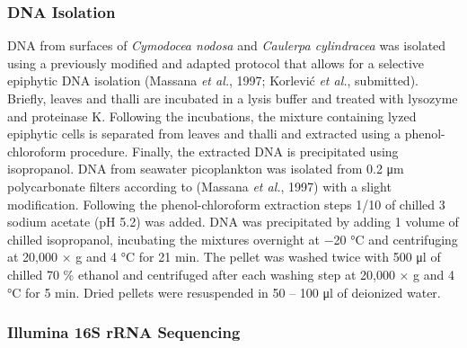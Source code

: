 \documentclass[12pt,]{article}
\begin{document}
\hypertarget{dna-isolation}{%
\subsubsection{DNA Isolation}\label{dna-isolation}}

DNA from surfaces of \emph{Cymodocea nodosa} and \emph{Caulerpa
cylindracea} was isolated using a previously modified and adapted
protocol that allows for a selective epiphytic DNA isolation (Massana
\emph{et al.}, 1997; Korlević \emph{et al.}, submitted). Briefly, leaves
and thalli are incubated in a lysis buffer and treated with lysozyme and
proteinase K. Following the incubations, the mixture containing lyzed
epiphytic cells is separated from leaves and thalli and extracted using
a phenol-chloroform procedure. Finally, the extracted DNA is
precipitated using isopropanol. DNA from seawater picoplankton was
isolated from 0.2 \si{\um} polycarbonate filters according to (Massana
\emph{et al.}, 1997) with a slight modification. Following the
phenol-chloroform extraction steps 1/10 of chilled 3 \si{\Molar} sodium
acetate (pH 5.2) was added. DNA was precipitated by adding 1 volume of
chilled isopropanol, incubating the mixtures overnight at \num{-20}
\si{\degreeCelsius} and centrifuging at 20,000 × g and 4
\si{\degreeCelsius} for 21 \si{\minute}. The pellet was washed twice
with 500 \si{\ul} of chilled 70 \si{\percent} ethanol and centrifuged
after each washing step at 20,000 × g and 4 \si{\degreeCelsius} for 5
\si{\minute}. Dried pellets were resuspended in 50 -- 100 \si{\ul} of
deionized water.

\hypertarget{illumina-16s-rrna-sequencing}{%
\subsubsection{Illumina 16S rRNA
Sequencing}\label{illumina-16s-rrna-sequencing}}
\end{document}
